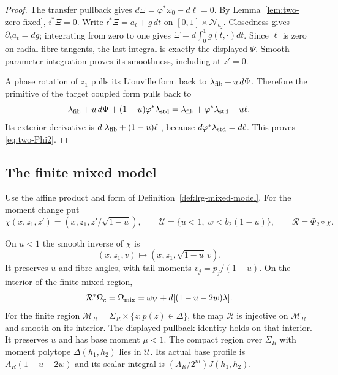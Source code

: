 \begin{proof}
The transfer pullback gives $d\Xi=\varphi^*\omega_0-d\ell=0$.
By Lemma~\ref{lem:two-zero-fixed}, $i^*\Xi=0$.
Write $\mathsf r^*\Xi=a_t+g\,dt$ on $[0,1]\times\mathcal N_{b_2}$.
Closedness gives $\partial_ta_t=dg$; integrating from zero to one gives
$\Xi=d\int_0^1g(t,\cdot)dt$.
Since $\ell$ is zero on radial fibre tangents, the last integral is exactly the displayed $\Psi$.
Smooth parameter integration proves its smoothness, including at $z'=0$.

A phase rotation of $z_1$ pulls its Liouville form back to $\lambda_{\rm fib}+u\,d\Psi$.
Therefore the primitive of the target coupled form pulls back to
\[
 \lambda_{\rm fib}+u\,d\Psi+(1-u)\varphi^*\lambda_{\rm std}
 =\lambda_{\rm fib}+\varphi^*\lambda_{\rm std}-u\ell.
\]
Its exterior derivative is $d[\lambda_{\rm fib}+(1-u)\ell]$, because
$d\varphi^*\lambda_{\rm std}=d\ell$. This proves \eqref{eq:two-Phi2}.
\end{proof}

\subsection{The finite mixed model}\label{sec:two-mixed}

Use the affine product and form of Definition~\ref{def:lrg-mixed-model}.
For the moment change put
\[
 \chi(x,z_1,z')=(x,z_1,z'/\sqrt{1-u}),\qquad
 \mathcal U=\{u<1,\ w<b_2(1-u)\},\qquad \mathcal R=\Phi_2\circ\chi.
\]

\begin{lemma}\label{lem:two-mixed}
On $u<1$ the smooth inverse of $\chi$ is
\[
 (x,z_1,v)\longmapsto(x,z_1,\sqrt{1-u}\,v).
\]
It preserves $u$ and fibre angles, with tail moments $v_j=p_j/(1-u)$. On the interior of the finite mixed region,
\[
 \mathcal R^*\Omega_c=\Omega_{\rm mix}=\omega_V+d[(1-u-2w)\lambda].
\]
For the finite region $\mathcal M_R=\Sigma_R\times\{z:p(z)\in\Delta\}$, the map $\mathcal R$ is injective on $\mathcal M_R$ and smooth on its interior. The displayed pullback identity holds on that interior. It preserves $u$ and has base moment $\mu<1$.
The compact region over $\Sigma_R$ with moment polytope $\Delta(h_1,h_2)$ lies in $\mathcal U$.
Its actual base profile is $A_R(1-u-2w)$ and its scalar integral is
$(A_R/2^m)J(h_1,h_2)$.
\end{lemma}

